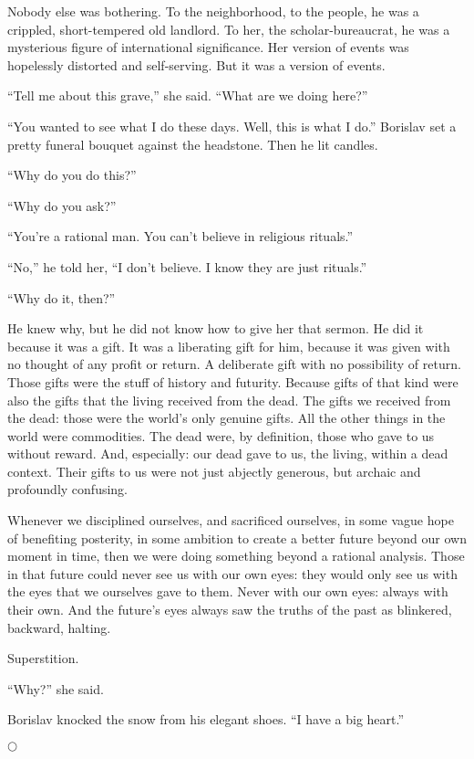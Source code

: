 \documentclass[20 pt,twoside,extrafontsizes,final]{memoir}
\begin{document}
Nobody else was bothering. To the neighborhood, to the people, he was a crippled, short-tempered old landlord. To her, the scholar-bureaucrat, he was a mysterious figure of international significance. Her version of events was hopelessly distorted and self-serving. But it was a version of events.

``Tell me about this grave,'' she said. ``What are we doing here?''

``You wanted to see what I do these days. Well, this is what I do.'' Borislav set a pretty funeral bouquet against the headstone. Then he lit candles.

``Why do you do this?''

``Why do you ask?''

``You're a rational man. You can't believe in religious rituals.''

``No,'' he told her, ``I don't believe. I know they are just rituals.''

``Why do it, then?''

He knew why, but he did not know how to give her that sermon. He did it because it was a gift. It was a liberating gift for him, because it was given with no thought of any profit or return. A deliberate gift with no possibility of return. Those gifts were the stuff of history and futurity. Because gifts of that kind were also the gifts that the living received from the dead. The gifts we received from the dead: those were the world's only genuine gifts. All the other things in the world were commodities. The dead were, by definition, those who gave to us without reward. And, especially: our dead gave to us, the living, within a dead context. Their gifts to us were not just abjectly generous, but archaic and profoundly confusing.

Whenever we disciplined ourselves, and sacrificed ourselves, in some vague hope of benefiting posterity, in some ambition to create a better future beyond our own moment in time, then we were doing something beyond a rational analysis. Those in that future could never see us with our own eyes: they would only see us with the eyes that we ourselves gave to them. Never with our own eyes: always with their own. And the future's eyes always saw the truths of the past as blinkered, backward, halting. 

Superstition.

``Why?'' she said.

Borislav knocked the snow from his elegant shoes. ``I have a big heart.''

\vfil
\centerline{$\bigcirc$}
\end{document}
